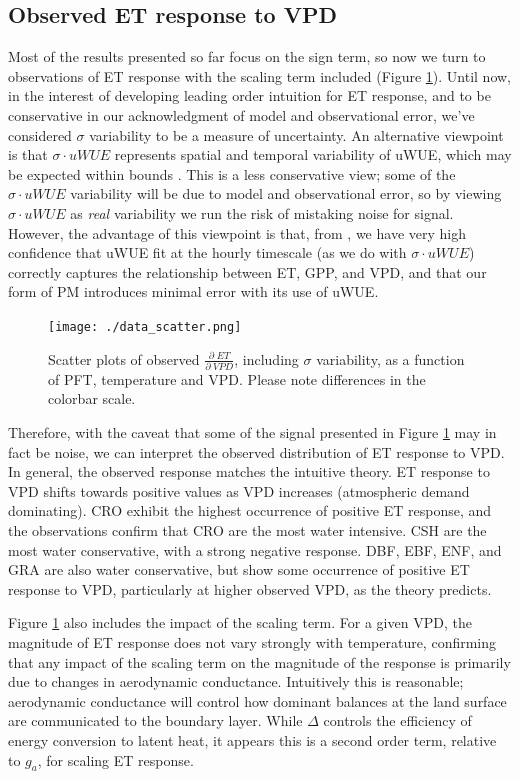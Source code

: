 \documentclass[draft,linenumbers]{agujournal}
\begin{document}
\subsection{Observed ET response to VPD}

Most of the results presented so far focus on the sign term, so now we turn to observations of ET response with the scaling term included (Figure \ref{data_scatter}). Until now, in the interest of developing leading order intuition for ET response, and to be conservative in our acknowledgment of model and observational error, we've considered $\sigma$ variability to be a measure of uncertainty. An alternative viewpoint is that $\sigma \cdot uWUE$ represents spatial and temporal variability of uWUE, which may be expected within bounds \citep[see Table \ref{pft}, also ][]{Zhou_2015}. This is a less conservative view; some of the $\sigma \cdot uWUE$ variability will be due to model and observational error, so by viewing $\sigma \cdot uWUE$ as \textit{real} variability we run the risk of mistaking noise for signal. However, the advantage of this viewpoint is that, from \citet{Zhou_2014}, we have very high confidence that uWUE fit at the hourly timescale (as we do with $\sigma \cdot uWUE$) correctly captures the relationship between ET, GPP, and VPD, and that our form of PM introduces minimal error with its use of uWUE.

\begin{figure}
\centering
\centerline{\texttt{[image: ./data\_scatter.png]}}
\caption{Scatter plots of observed $\frac{\partial \; ET}{\partial \; VPD}$, including $\sigma$ variability, as a function of PFT, temperature and VPD. Please note differences in the colorbar scale.}
\label{data_scatter}
\end{figure}

Therefore, with the caveat that some of the signal presented in Figure \ref{data_scatter} may in fact be noise, we can interpret the observed distribution of ET response to VPD. In general, the observed response matches the intuitive theory. ET response to VPD shifts towards positive values as VPD increases (atmospheric demand dominating). CRO exhibit the highest occurrence of positive ET response, and the observations confirm that CRO are the most water intensive. CSH are the most water conservative, with a strong negative response. DBF, EBF, ENF, and GRA are also water conservative, but show some occurrence of positive ET response to VPD, particularly at higher observed VPD, as the theory predicts.

Figure \ref{data_scatter} also includes the impact of the scaling term. For a given VPD, the magnitude of ET response does not vary strongly with temperature, confirming that any impact of the scaling term on the magnitude of the response is primarily due to changes in aerodynamic conductance. Intuitively this is reasonable; aerodynamic conductance will control how dominant balances at the land surface are communicated to the boundary layer. While $\Delta$ controls the efficiency of energy conversion to latent heat, it appears this is a second order term, relative to $g_a$, for scaling ET response. 
\end{document}
